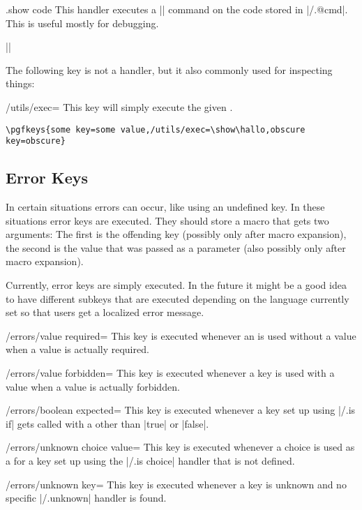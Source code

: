 \begin{handler}{{.show code}}
  This handler executes a |\show| command on the code stored in
  |/.@cmd|. This is useful mostly for debugging.

  \example ||
\end{handler}

The following key is not a handler, but it also commonly used for
inspecting things:
\begin{key}{/utils/exec=}
  This key will simply execute the given .

  \example \verb|\pgfkeys{some key=some value,/utils/exec=\show\hallo,obscure key=obscure}|
\end{key}


\subsection{Error Keys}

In certain situations errors can occur, like using an undefined
key. In these situations error keys are executed. They should store a
macro that gets two arguments: The first is the offending key
(possibly only after macro expansion), the second is the value that
was passed as a parameter (also possibly only after macro expansion).

Currently, error keys are simply executed. In the future it might be a
good idea to have different subkeys that are executed depending on the
language currently set so that users get a localized error message.

\begin{key}{/errors/value required=}
  This key is executed whenever an  is used
  without a value when a value is actually required.
\end{key}

\begin{key}{/errors/value forbidden=}
  This key is executed whenever a key is used with a value when a
  value is actually forbidden.
\end{key}

\begin{key}{/errors/boolean expected=}
  This key is executed whenever a key set up using |/.is if| gets called
  with a  other than |true| or |false|.
\end{key}

\begin{key}{/errors/unknown choice value=}
  This key is executed whenever a choice is used as a  for
  a key set up using the |/.is choice| handler that is not defined.
\end{key}

\begin{key}{/errors/unknown key=}
  This key is executed whenever a key is unknown and no specific
  |/.unknown| handler is found.
\end{key}


